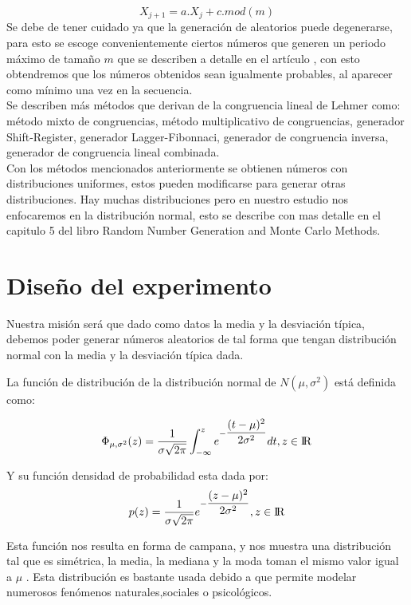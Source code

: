 \documentclass[conference,a4paper]{IEEEtran}
\begin{document}
\begin{equation}
X_{j+1} = a.X_{j}+c.mod(m)
\end{equation}
Se debe de tener cuidado ya que la generaci\'on de aleatorios puede degenerarse, para esto se escoge convenientemente ciertos n\'umeros que generen un periodo m\'aximo de tama\~no $m$ que se describen a detalle en el art\'iculo \cite{b2}, con esto obtendremos que los n\'umeros obtenidos sean igualmente probables, al aparecer como m\'inimo una vez en la secuencia.\\
Se describen m\'as m\'etodos que derivan de la congruencia lineal de Lehmer como: m\'etodo mixto de congruencias, m\'etodo multiplicativo de congruencias, generador Shift-Register, generador Lagger-Fibonnaci, generador de congruencia inversa, generador de congruencia lineal combinada.\\
Con los m\'etodos mencionados anteriormente se obtienen n\'umeros con distribuciones uniformes, estos pueden modificarse para generar otras distribuciones. Hay muchas distribuciones pero en nuestro estudio nos enfocaremos en la distribuci\'on normal, esto se describe con mas detalle en el capitulo 5 del libro Random Number Generation and Monte Carlo Methods\cite{b3}. 
  
\section{\textbf{Dise\~no del experimento}}

Nuestra misi\'on ser\'a que dado como datos la media y la desviaci\'on t\'ipica, debemos poder generar n\'umeros aleatorios de tal forma que tengan distribuci\'on normal con la media y la desviaci\'on t\'ipica dada.

La funci\'on de distribuci\'on de la distribuci\'on normal de $N(\mu,\sigma^2)$ est\'a definida como:

$$\Phi_{\mu,\sigma^2}(z) = \dfrac {1}{\sigma\sqrt{2\pi}}
\int_{-\infty}^{z} e^{-\dfrac{(t-\mu)^2}{2\sigma^2}} dt, z \in {\rm I\!R} $$

Y su funci\'on densidad de probabilidad esta dada por:
$$p(z) = \dfrac {1}{\sigma\sqrt{2\pi}}
e^{-\dfrac{(z-\mu)^2}{2\sigma^2}} , z \in {\rm I\!R} $$

Esta funci\'on nos resulta en forma de campana, y nos muestra una distribuci\'on tal que es sim\'etrica, la media, la mediana y la moda toman el mismo valor igual a $\mu$ . Esta distribuci\'on es bastante usada debido a que permite modelar numerosos fen\'omenos naturales,sociales o psicol\'ogicos.
\end{document}
